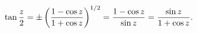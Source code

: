 \[\mathop{\tan\/}\nolimits\frac{z}{2}=\pm\left(\frac{1-\mathop{\cos\/}\nolimits z%
}{1+\mathop{\cos\/}\nolimits z}\right)^{1/2}=\frac{1-\mathop{\cos\/}\nolimits z%
}{\mathop{\sin\/}\nolimits z}=\frac{\mathop{\sin\/}\nolimits z}{1+\mathop{\cos%
\/}\nolimits z}.\]